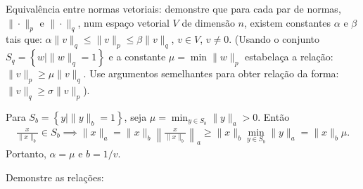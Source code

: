 \documentclass[a4paper,12pt, leqno, answers]{exam}
\begin{document}
\begin{questions}
     Equival\^{e}ncia entre normas vetoriais: demonstre que para cada par de normas, $\| \cdot \|_p$ e $\| \cdot \|_q$, num espa\c{c}o vetorial $V$ de dimens\~{a}o $n$, existem constantes $\alpha$ e $\beta$ tais que: $\alpha \| v \|_q \leq \| v \|_p \leq \beta \| v \|_q$, $v \in V$, $v \neq 0$. (Usando o conjunto $S_q = \left\{ w \mid \| w \|_q = 1 \right\}$ e a constante $\mu = \min \| w \|_p$ estabela\c{c}a a rela\c{c}\~{a}o: $\| v \|_p \geq \mu \| v \|_q$. Use argumentos semelhantes para obter rela\c{c}\~{a}o da forma: $\| v \|_q \geq \sigma \| v \|_p$).
    \begin{solution}
        Para $S_b = \left\{ y \mid \| y \|_b = 1 \right\}$, seja $\mu = \min_{y \in S_b} \| y \|_a > 0$. Ent\~{a}o
        \begin{align*}
            \frac{x}{\| x \|_b} \in S_b \implies \| x \|_a = \| x \|_b \left\| \frac{x}{\| x \|_b} \right \|_a \geq \| x \|_b \min_{y \in S_b} \| y \|_a = \| x \|_b \mu.
        \end{align*}
         Portanto, $\alpha = \mu$ e $b = 1 / v$.
    \end{solution}

    \question Demonstre as rela\c{c}\~{o}es:
    \begin{parts}

\end{parts}
\end{questions}
\end{document}

